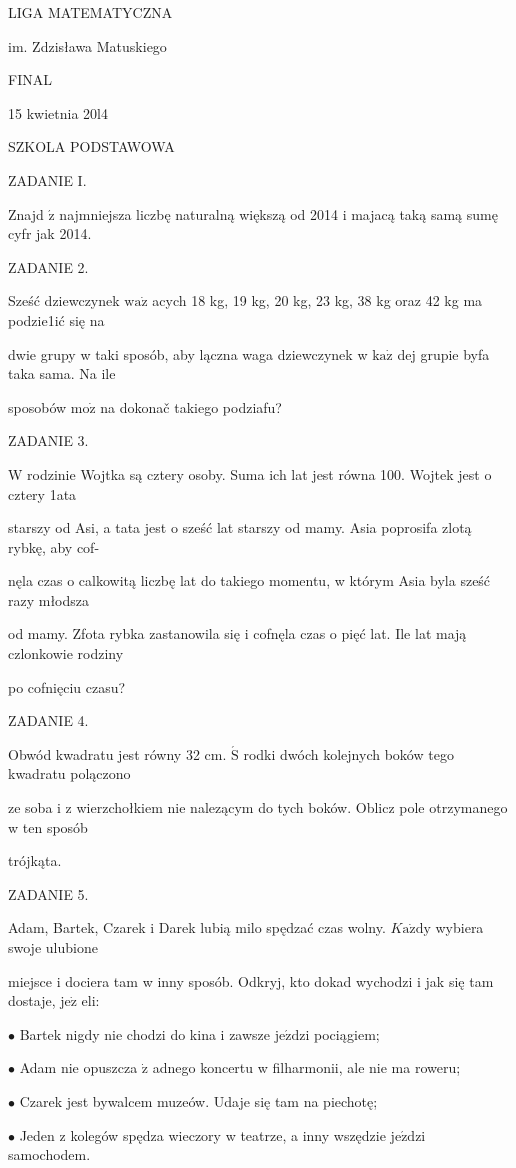 \documentclass[a4paper,12pt]{article}
\begin{document}
LIGA MATEMATYCZNA

im. Zdzisława Matuskiego

FINAL

15 kwietnia 20l4

SZKOLA PODSTAWOWA

ZADANIE I.

Znajd $\acute{\mathrm{z}}$ najmniejsza liczbę naturalną większą od 2014 i majacą taką samą sumę cyfr jak 2014.

ZADANIE 2.

Sześć dziewczynek $\mathrm{w}\mathrm{a}\dot{\mathrm{z}}$ acych 18 kg, 19 kg, 20 kg, 23 kg, 38 kg oraz 42 kg ma podzie1ić się na

dwie grupy w taki sposób, aby lączna waga dziewczynek w $\mathrm{k}\mathrm{a}\dot{\mathrm{z}}$ dej grupie byfa taka sama. Na ile

sposobów $\mathrm{m}\mathrm{o}\dot{\mathrm{z}}$ na dokonač takiego podziafu?

ZADANIE 3.

W rodzinie Wojtka są cztery osoby. Suma ich lat jest równa 100. Wojtek jest o cztery 1ata

starszy od Asi, a tata jest o sześć lat starszy od mamy. Asia poprosifa zlotą rybkę, aby cof-

nęla czas o calkowitą liczbę lat do takiego momentu, w którym Asia byla sześć razy młodsza

od mamy. Zfota rybka zastanowila się i cofnęla czas o pięć lat. Ile lat mają czlonkowie rodziny

po cofnięciu czasu?

ZADANIE 4.

Obwód kwadratu jest równy 32 cm. $\acute{\mathrm{S}}$ rodki dwóch kolejnych boków tego kwadratu polączono

ze soba i z wierzchołkiem nie nalezącym do tych boków. Oblicz pole otrzymanego w ten sposób

trójkąta.

ZADANIE 5.

Adam, Bartek, Czarek i Darek lubią milo spędzać czas wolny. $K\mathrm{a}\dot{\mathrm{z}}\mathrm{d}\mathrm{y}$ wybiera swoje ulubione

miejsce i dociera tam w inny sposób. Odkryj, kto dokad wychodzi i jak się tam dostaje, $\mathrm{j}\mathrm{e}\dot{\mathrm{z}}$ eli:

$\bullet$ Bartek nigdy nie chodzi do kina i zawsze $\mathrm{j}\mathrm{e}\acute{\mathrm{z}}\mathrm{d}\mathrm{z}\mathrm{i}$ pociągiem;

$\bullet$ Adam nie opuszcza $\dot{\mathrm{z}}$ adnego koncertu w filharmonii, ale nie ma roweru;

$\bullet$ Czarek jest bywalcem muzeów. Udaje się tam na piechotę;

$\bullet$ Jeden z kolegów spędza wieczory w teatrze, a inny wszędzie $\mathrm{j}\mathrm{e}\acute{\mathrm{z}}\mathrm{d}\mathrm{z}\mathrm{i}$ samochodem.
\end{document}
